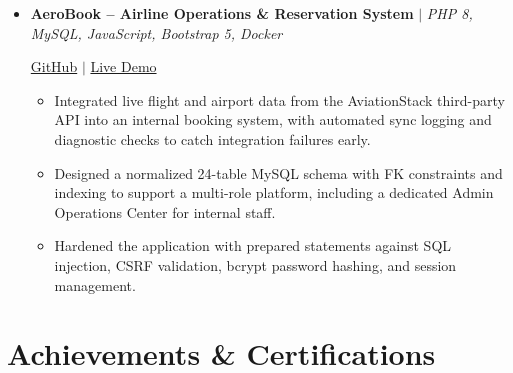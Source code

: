 \documentclass[letterpaper,10pt]{article}
\newcommand{\resumeItem}[1]{
\item{#1 \vspace{1pt}}
}
\newcommand{\resumeProjectHeading}[1]{
\item #1\par\vspace{-2pt}
}
\begin{document}
\begin{itemize}[
leftmargin=0.18in,
itemsep=1pt,
topsep=0pt,
parsep=0pt,
partopsep=0pt
]
\begin{itemize}[
leftmargin=0.2in,
itemsep=1pt,
topsep=0pt,
parsep=0pt,
partopsep=0pt
]
\resumeItem{Built a secure prediction REST API (POST /api/predict) with per-user API keys (SHA-256 hashed at rest, Fernet-encrypted for owner reveal), tiered rate limiting, and quota enforcement for high stability under load.}
\resumeItem{Tuned and deployed a HistGradientBoostingRegressor on 49,639 real delivery records via randomized search with 5-fold CV, achieving a mean absolute error of 0.536 days on holdout.}
\resumeItem{Containerized the service with Docker and built a GitHub Actions CI pipeline with health and metrics endpoints for continuous monitoring and deployment.}

\end{itemize}

\resumeProjectHeading{
\textbf{AeroBook -- Airline Operations \& Reservation System}
$|$ \textit{PHP 8, MySQL, JavaScript, Bootstrap 5, Docker}
}

\vspace{1pt}

\href{https://github.com/suman2308/airline-reservation-system}{GitHub}
$|$
\href{https://aerobook-2snu.onrender.com/}{Live Demo}

\vspace{1pt}

\begin{itemize}[
leftmargin=0.2in,
itemsep=1pt,
topsep=0pt,
parsep=0pt,
partopsep=0pt
]

\resumeItem{Integrated live flight and airport data from the AviationStack third-party API into an internal booking system, with automated sync logging and diagnostic checks to catch integration failures early.}
\resumeItem{Designed a normalized 24-table MySQL schema with FK constraints and indexing to support a multi-role platform, including a dedicated Admin Operations Center for internal staff.}
\resumeItem{Hardened the application with prepared statements against SQL injection, CSRF validation, bcrypt password hashing, and session management.}

\end{itemize}

\end{itemize}
\vspace{-5pt}

\section{Achievements \& Certifications}
\end{document}
